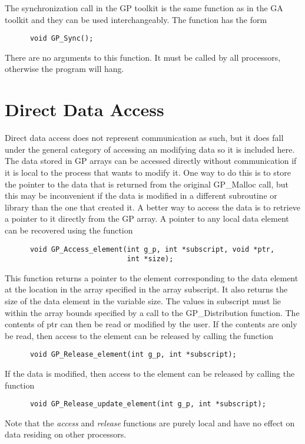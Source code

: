 The synchronization call in the GP toolkit is the same function as in the GA
toolkit and they can be used interchangeably. The function has the form

\begin{verbatim}
      void GP_Sync();
\end{verbatim}

\noindent
There are no arguments to this function. It must be called by all processors,
otherwise the program will hang.

\section{Direct Data Access}

Direct data access does not represent communication as such, but it does fall
under the general category of accessing an modifying data so it is included
here. The data stored in GP arrays can be accessed directly without
communication if it is local to the process that wants to modify it. One way to
do this is to store the pointer to the data that is returned from the original
GP\_Malloc call, but this may be inconvenient if the data is modified in a
different subroutine or library than the one that created it. A better way to
access the data is to retrieve a pointer to it directly from the GP array. A
pointer to any local data element can be recovered using the function

\begin{verbatim}
      void GP_Access_element(int g_p, int *subscript, void *ptr,
                             int *size);
\end{verbatim}

\noindent
This function returns a pointer to the element corresponding to the data element
at the location in the array specified in the array subscript. It also returns
the size of the data element in the variable size. The values in subscript must
lie within the array bounds specified by a call to the GP\_Distribution
function. The contents of ptr can then be read or modified by the user. If the
contents are only be read, then access to the element can be released by calling
the function

\begin{verbatim}
      void GP_Release_element(int g_p, int *subscript);
\end{verbatim}

\noindent
If the data is modified, then access to the element can be released by calling
the function

\begin{verbatim}
      void GP_Release_update_element(int g_p, int *subscript);
\end{verbatim}

\noindent
Note that the \emph{access} and \emph{release} functions are purely local and
have no effect on data residing on other processors.
